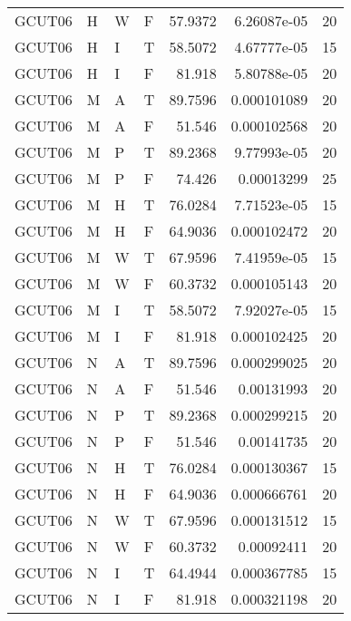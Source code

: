 \begin{table}[htb!]
{\begin{tabular}{llllrrr}
            GCUT06   & H     & W     & F          & 57.9372    & 6.26087e-05 & 20       \\
            GCUT06   & H     & I     & T          & 58.5072    & 4.67777e-05 & 15       \\
            GCUT06   & H     & I     & F          & 81.918     & 5.80788e-05 & 20       \\
            GCUT06   & M     & A     & T          & 89.7596    & 0.000101089 & 20       \\
            GCUT06   & M     & A     & F          & 51.546     & 0.000102568 & 20       \\
            GCUT06   & M     & P     & T          & 89.2368    & 9.77993e-05 & 20       \\
            GCUT06   & M     & P     & F          & 74.426     & 0.00013299  & 25       \\
            GCUT06   & M     & H     & T          & 76.0284    & 7.71523e-05 & 15       \\
            GCUT06   & M     & H     & F          & 64.9036    & 0.000102472 & 20       \\
            GCUT06   & M     & W     & T          & 67.9596    & 7.41959e-05 & 15       \\
            GCUT06   & M     & W     & F          & 60.3732    & 0.000105143 & 20       \\
            GCUT06   & M     & I     & T          & 58.5072    & 7.92027e-05 & 15       \\
            GCUT06   & M     & I     & F          & 81.918     & 0.000102425 & 20       \\
            GCUT06   & N     & A     & T          & 89.7596    & 0.000299025 & 20       \\
            GCUT06   & N     & A     & F          & 51.546     & 0.00131993  & 20       \\
            GCUT06   & N     & P     & T          & 89.2368    & 0.000299215 & 20       \\
            GCUT06   & N     & P     & F          & 51.546     & 0.00141735  & 20       \\
            GCUT06   & N     & H     & T          & 76.0284    & 0.000130367 & 15       \\
            GCUT06   & N     & H     & F          & 64.9036    & 0.000666761 & 20       \\
            GCUT06   & N     & W     & T          & 67.9596    & 0.000131512 & 15       \\
            GCUT06   & N     & W     & F          & 60.3732    & 0.00092411  & 20       \\
            GCUT06   & N     & I     & T          & 64.4944    & 0.000367785 & 15       \\
            GCUT06   & N     & I     & F          & 81.918     & 0.000321198 & 20       \\
            \hline
        \end{tabular}
    }{
    }
\end{table} 
